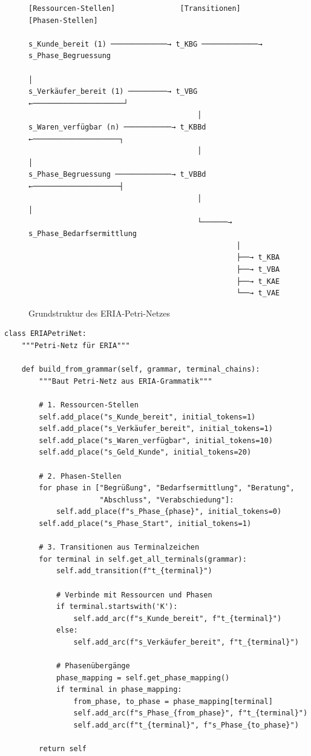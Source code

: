 \documentclass[12pt,a4paper]{article}
\begin{document}
\begin{figure}[H]
\centering
\begin{verbatim}
[Ressourcen-Stellen]               [Transitionen]              [Phasen-Stellen]
                                    
s_Kunde_bereit (1) ─────────────→ t_KBG ─────────────→ s_Phase_Begruessung
                                                               │
s_Verkäufer_bereit (1) ─────────→ t_VBG ←─────────────────────┘
                                       │
s_Waren_verfügbar (n) ───────────→ t_KBBd ←────────────────────┐
                                       │                        │
s_Phase_Begruessung ─────────────→ t_VBBd ←────────────────────┤
                                       │                        │
                                       └──────→ s_Phase_Bedarfsermittlung
                                                │
                                                ├──→ t_KBA
                                                ├──→ t_VBA
                                                ├──→ t_KAE
                                                └──→ t_VAE
\end{verbatim}
\caption{Grundstruktur des ERIA-Petri-Netzes}
\label{fig:petrinet}
\end{figure}

\begin{lstlisting}[caption=Petri-Netz-Konstruktion in ERIA]
class ERIAPetriNet:
    """Petri-Netz für ERIA"""
    
    def build_from_grammar(self, grammar, terminal_chains):
        """Baut Petri-Netz aus ERIA-Grammatik"""
        
        # 1. Ressourcen-Stellen
        self.add_place("s_Kunde_bereit", initial_tokens=1)
        self.add_place("s_Verkäufer_bereit", initial_tokens=1)
        self.add_place("s_Waren_verfügbar", initial_tokens=10)
        self.add_place("s_Geld_Kunde", initial_tokens=20)
        
        # 2. Phasen-Stellen
        for phase in ["Begrüßung", "Bedarfsermittlung", "Beratung", 
                      "Abschluss", "Verabschiedung"]:
            self.add_place(f"s_Phase_{phase}", initial_tokens=0)
        self.add_place("s_Phase_Start", initial_tokens=1)
        
        # 3. Transitionen aus Terminalzeichen
        for terminal in self.get_all_terminals(grammar):
            self.add_transition(f"t_{terminal}")
            
            # Verbinde mit Ressourcen und Phasen
            if terminal.startswith('K'):
                self.add_arc(f"s_Kunde_bereit", f"t_{terminal}")
            else:
                self.add_arc(f"s_Verkäufer_bereit", f"t_{terminal}")
            
            # Phasenübergänge
            phase_mapping = self.get_phase_mapping()
            if terminal in phase_mapping:
                from_phase, to_phase = phase_mapping[terminal]
                self.add_arc(f"s_Phase_{from_phase}", f"t_{terminal}")
                self.add_arc(f"t_{terminal}", f"s_Phase_{to_phase}")
        
        return self
\end{lstlisting}
\end{document}
